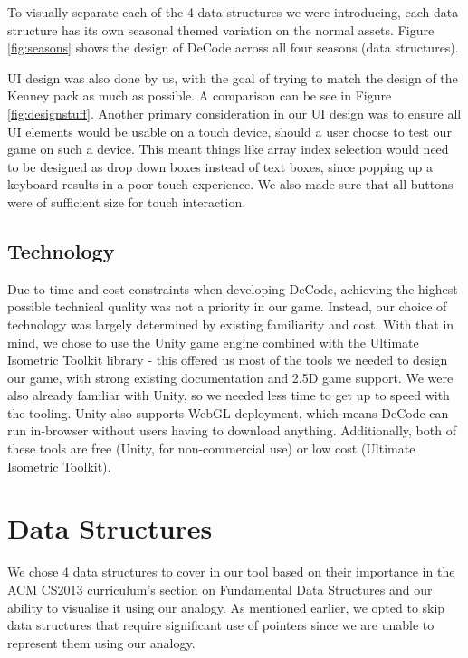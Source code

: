 \documentclass[10pt]{article}
\begin{document}
To visually separate each of the 4 data structures we were introducing, each data structure has its own seasonal themed variation on the normal assets. Figure \ref{fig:seasons} shows the design of DeCode across all four seasons (data structures).\par
UI design was also done by us, with the goal of trying to match the design of the Kenney pack as much as possible. A comparison can be see in Figure \ref{fig:designstuff}. Another primary consideration in our UI design was to ensure all UI elements would be usable on a touch device, should a user choose to test our game on such a device. This meant things like array index selection would need to be designed as drop down boxes instead of text boxes, since popping up a keyboard results in a poor touch experience. We also made sure that all buttons were of sufficient size for touch interaction.
\subsection{Technology}
Due to time and cost constraints when developing DeCode, achieving the highest possible technical quality was not a priority in our game. Instead, our choice of technology was largely determined by existing familiarity and cost. With that in mind, we chose to use the Unity game engine\cite{technologies} combined with the Ultimate Isometric Toolkit\cite{isometricToolkit} library - this offered us most of the tools we needed to design our game, with strong existing documentation and 2.5D game support. We were also already familiar with Unity, so we needed less time to get up to speed with the tooling. Unity also supports WebGL deployment, which means DeCode can run in-browser without users having to download anything. Additionally, both of these tools are free (Unity, for non-commercial use) or low cost (Ultimate Isometric Toolkit).\par
\section{Data Structures}
We chose 4 data structures to cover in our tool based on their importance in the ACM CS2013 curriculum's section on Fundamental Data Structures\cite{CS2013} and our ability to visualise it using our analogy. As mentioned earlier, we opted to skip data structures that require significant use of pointers since we are unable to represent them using our analogy.
\end{document}
